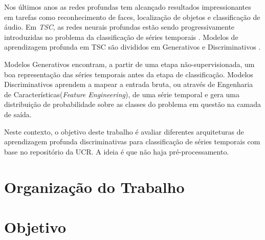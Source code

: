 Nos últimos anos as redes profundas tem alcançado resultados impressionantes em tarefas como reconhecimento de faces, localização de objetos e classificação de áudio. Em \textit{TSC}, as redes neurais profundas estão sendo progressivamente introduzidas no problema da classificação de séries temporais \cite{Zheng2014} \cite{Wang01}  \cite{tscFromScratch}. Modelos de aprendizagem profunda em TSC são divididos em Generativos e Discriminativos \cite{ismail2018}.

Modelos Generativos encontram, a partir de uma etapa não-supervisionada, um boa representação das séries temporais antes da etapa de classificação. Modelos Discriminativos aprendem a mapear a entrada bruta, ou através de Engenharia de Características(\textit{Feature Engineering}), de uma série temporal e gera uma distribuição de probabilidade sobre as classes do problema em questão na camada de saída. 

Neste contexto, o objetivo deste trabalho é avaliar diferentes arquiteturas de aprendizagem profunda discriminativas para classificação de séries temporais com base no repositório da UCR. A ideia é que não haja pré-processamento.




\section{Organização do Trabalho}




\section{Objetivo}

